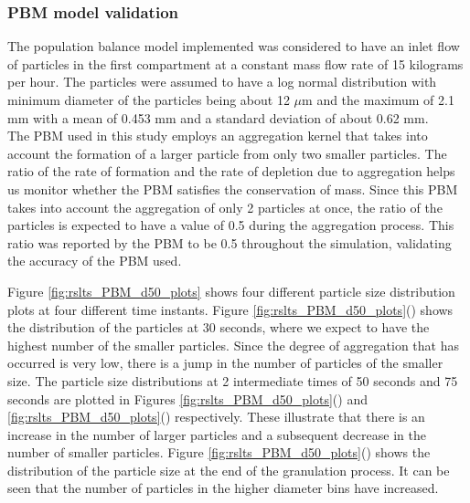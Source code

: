 \documentclass[preprint,11pt,authoryear]{elsarticle}
\begin{document}
\subsubsection{PBM model validation}
 The population balance model implemented was considered to have an inlet flow of particles in the 
first compartment at a constant mass flow rate of 15 kilograms per hour. The particles were assumed 
to have a log normal distribution with minimum diameter of the particles being about 12 $\mu$m and the 
maximum of 2.1 mm with a mean of 0.453 mm and a standard deviation of about 0.62 mm. \\
The PBM used in this study employs an aggregation kernel that takes into account the formation of a 
larger particle from only two smaller particles. The ratio of the rate of formation and the rate of 
depletion due to aggregation helps us monitor whether the PBM satisfies the conservation of mass. 
Since this PBM takes into account the aggregation of only 2 particles at once, the ratio of the particles 
is expected to have a value of 0.5 during the aggregation process. This ratio was reported by the PBM 
to be 0.5 throughout the simulation, validating the accuracy of the PBM used.

Figure \ref{fig:rslts_PBM_d50_plots} shows four different particle size distribution plots at four 
different time instants. Figure \ref{fig:rslts_PBM_d50_plots}() shows the distribution of 
the particles at 30 seconds, where we expect to have the highest number of the smaller particles. 
Since the degree of aggregation that has occurred is very low, there is a jump in the number of 
particles of the smaller size. The particle size distributions at 2 intermediate times of 50 seconds and 
75 seconds are plotted in Figures \ref{fig:rslts_PBM_d50_plots}() and 
\ref{fig:rslts_PBM_d50_plots}() respectively. These illustrate that there is an increase in 
the number of larger particles  and a subsequent decrease in the number of smaller particles. 
Figure \ref{fig:rslts_PBM_d50_plots}() shows the distribution 
of the particle size at the end of the granulation process. It can be seen that the number of particles in 
the higher diameter bins have increased.
\end{document}
